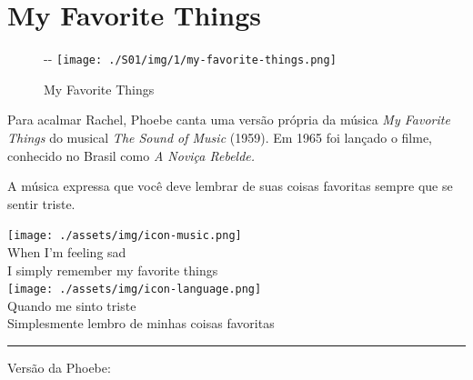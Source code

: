 \hypertarget{my-favorite-things}{%
\section{My Favorite Things}\label{my-favorite-things}}

\begin{figure}[!ht]
  \begin{adjustwidth}{-\oddsidemargin-1in}{-\rightmargin}
    \centering
    \texttt{[image: ./S01/img/1/my-favorite-things.png]}
    \caption{My Favorite Things\label{fig:my-favorite-things}}
  \end{adjustwidth}
\end{figure}

Para acalmar Rachel, Phoebe canta uma versão própria da música \emph{My
Favorite Things} do musical \emph{The Sound of Music} (1959). Em 1965
foi lançado o filme, conhecido no Brasil como \emph{A Noviça Rebelde.}

A música expressa que você deve lembrar de suas coisas favoritas sempre
que se sentir triste.

\bigskip
\begin{tcolorbox}[enhanced,
    drop fuzzy shadow southeast, boxrule=0.3pt,
    lower separated=false, sidebyside, sidebyside align=top,
    halign=flush right, halign lower=left,
    colframe=black!30!dialogoBorder,colback=musicaBg]
\texttt{[image: ./assets/img/icon-music.png]}\\
When I’m feeling sad\\I simply remember my favorite things\\
\tcblower
\texttt{[image: ./assets/img/icon-language.png]}\\
Quando me sinto triste\\Simplesmente lembro de minhas coisas favoritas\\
\end{tcolorbox}

\begin{center}\rule{0.5\linewidth}{0.5pt}\end{center}

Versão da Phoebe:

